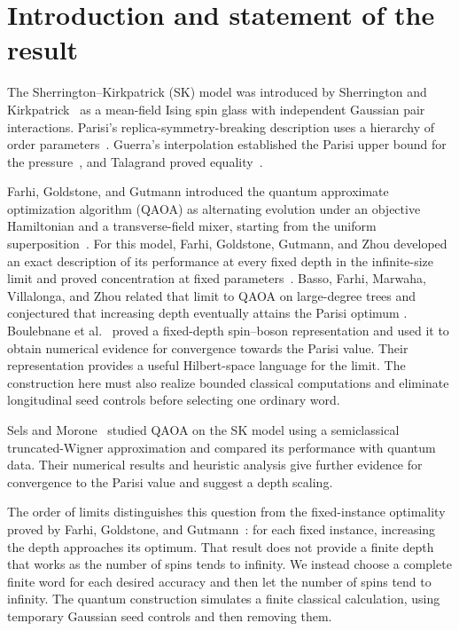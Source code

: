 \section{Introduction and statement of the result}\label{sec:introduction}

The Sherrington--Kirkpatrick (SK) model was introduced by Sherrington and
Kirkpatrick~\cite{SK1975}
as a mean-field Ising spin glass with independent Gaussian pair
interactions. Parisi's replica-symmetry-breaking description uses a
hierarchy of order parameters~\cite{Parisi1979}. Guerra's interpolation
established the Parisi upper bound for the pressure~\cite{Guerra2003},
and Talagrand proved equality~\cite{Talagrand2006}.

Farhi, Goldstone, and Gutmann introduced the quantum approximate
optimization algorithm (QAOA) as alternating evolution under an objective
Hamiltonian and a transverse-field mixer, starting from the uniform
superposition~\cite{FGG2014}. For this model, Farhi, Goldstone, Gutmann, and Zhou
developed an exact description of its performance at every fixed depth in
the infinite-size limit and proved concentration at fixed
parameters~\cite{FGGZ2022}. Basso, Farhi, Marwaha, Villalonga,
and Zhou related that limit to QAOA on large-degree trees and conjectured
that increasing depth eventually attains the Parisi optimum
\cite[Section~7, Equation~(7.2)]{BFMVZ2022}.
Boulebnane et al.~\cite{BKL2026} proved a fixed-depth spin--boson
representation and used it to obtain numerical evidence for convergence
towards the Parisi value. Their representation provides a useful
Hilbert-space language for the limit. The construction here must also
realize bounded classical computations and eliminate longitudinal seed
controls before selecting one ordinary word.

Sels and Morone~\cite{SM2026} studied QAOA on the SK model using a
semiclassical truncated-Wigner approximation and compared its performance
with quantum data. Their numerical results and heuristic analysis give
further evidence for convergence to the Parisi value and suggest a depth
scaling.

The order of limits distinguishes this question from the fixed-instance
optimality proved by Farhi, Goldstone, and Gutmann~\cite[Section~VI,
Equation~(10)]{FGG2014}:
for each fixed instance, increasing the depth approaches its optimum.
That result does not provide a finite depth that works as the number
of spins tends to infinity. We instead choose a complete finite word for
each desired accuracy and then let the number of spins tend to
infinity. The quantum construction simulates a finite classical
calculation, using temporary Gaussian seed controls and then
removing them.


